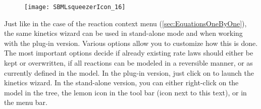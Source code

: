 \begin{figure}
\vspace{\wrapfigspace}
\texttt{[image: SBMLsqueezerIcon\_16]}
\end{figure}
Just like in the case of the reaction context menu (\vref{sec:EquationsOneByOne}), the same kinetics wizard can be used in stand-alone mode and when working with the \CellDesigner plug-in version. %
Various options allow you to customize how this is done.
The most important options decide if already existing rate laws should either be kept or overwritten, if all reactions can be modeled in a reversible manner, or as currently defined in the model.
In the \CellDesigner plug-in version, just click on  to launch the kinetics wizard.
In the stand-alone version, you can either right-click on the model in the \SBML tree, the lemon icon in the tool bar (icon next to this text), or  in the menu bar.


